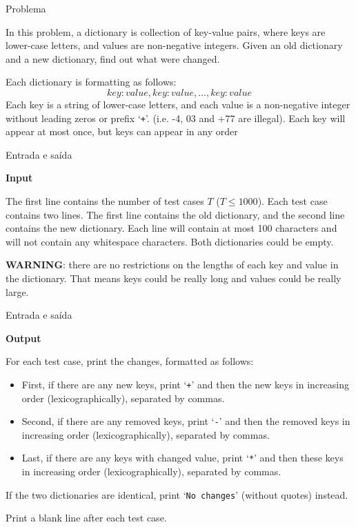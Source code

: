 
\begin{frame}[fragile]{Problema}

In this problem, a dictionary is collection of key-value pairs, where keys are lower-case letters, 
and values are non-negative integers. Given an old dictionary and a new dictionary, find out what 
were changed.

Each dictionary is formatting as follows:
\[
    {key:value,key:value,\ldots,key:value}
\]
Each key is a string of lower-case letters, and each value is a non-negative integer without leading
zeros or prefix ‘\texttt{+}’. (i.e. -4, 03 and +77 are illegal). Each key will appear at most once, 
but keys can appear in any order

\end{frame}

\begin{frame}[fragile]{Entrada e saída}

\textbf{Input}

The first line contains the number of test cases $T$ ($T\leq 1000$). Each test case contains two 
lines. The first line contains the old dictionary, and the second line contains the new dictionary. Each line will contain at most 100 characters and will not contain any whitespace characters. Both 
dictionaries could be empty.

\textbf{WARNING}: there are no restrictions on the lengths of each key and value in the dictionary. That means keys could be really long and values could be really large.

\end{frame}

\begin{frame}[fragile]{Entrada e saída}

\textbf{Output}

For each test case, print the changes, formatted as follows:
\begin{itemize}
    \item First, if there are any new keys, print ‘\texttt{+}’ and then the new keys in increasing 
        order (lexicographically), separated by commas.
    \item Second, if there are any removed keys, print ‘\texttt{-}’ and then the removed keys in 
        increasing order (lexicographically), separated by commas.
    \item Last, if there are any keys with changed value, print ‘\texttt{*}’ and then these keys 
        in increasing order (lexicographically), separated by commas.
\end{itemize}

If the two dictionaries are identical, print ‘\texttt{No changes}’ (without quotes) instead.

Print a blank line after each test case.
\end{frame}


